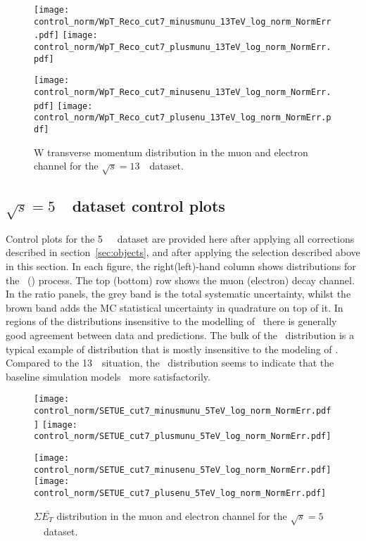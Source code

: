 \begin{figure}[h]
	\centering
	{\texttt{[image: control\_norm/WpT\_Reco\_cut7\_minusmunu\_13TeV\_log\_norm\_NormErr.pdf]}\label{f:}}
	{\texttt{[image: control\_norm/WpT\_Reco\_cut7\_plusmunu\_13TeV\_log\_norm\_NormErr.pdf]}\label{f:}}
	
	{\texttt{[image: control\_norm/WpT\_Reco\_cut7\_minusenu\_13TeV\_log\_norm\_NormErr.pdf]}\label{f:}}
	{\texttt{[image: control\_norm/WpT\_Reco\_cut7\_plusenu\_13TeV\_log\_norm\_NormErr.pdf]}\label{f:}}
	\caption{  W transverse momentum distribution in the muon and electron channel  for the $\sqrt{s} = 13$~\TeV\ dataset. }\end{figure}


\clearpage


\subsection{$\sqrt{s} = 5$~\TeV\ dataset control plots}
\label{subsec:controlplots5}
Control plots for the 5~\TeV\ \lowmu\ dataset are provided here after applying all corrections described in section~\ref{sec:objects}, and after applying the selection described above in this section. In each figure, the right(left)-hand column shows distributions for the \Wplus\ (\Wminus) process. The top (bottom) row shows the muon (electron) decay channel. In the ratio panels, the grey band is the total systematic uncertainty, whilst the brown band adds the MC statistical uncertainty in quadrature on top of it. In regions of the distributions insensitive to the modelling of \ptw\ there is generally good agreement between data and predictions. The bulk of the \mt\ distribution is a typical example of distribution that is mostly insensitive to the modeling of \ptw. Compared to the 13~\TeV\ situation, the \ut\ distribution seems to indicate that the baseline simulation models \ptw\ more satisfactorily.

\begin{figure}[h]
	\centering
	{\texttt{[image: control\_norm/SETUE\_cut7\_minusmunu\_5TeV\_log\_norm\_NormErr.pdf]}\label{f:SETUEmm5}}
	{\texttt{[image: control\_norm/SETUE\_cut7\_plusmunu\_5TeV\_log\_norm\_NormErr.pdf]}\label{f:SETUEpm5}}
	
	{\texttt{[image: control\_norm/SETUE\_cut7\_minusenu\_5TeV\_log\_norm\_NormErr.pdf]}\label{f:}}
	{\texttt{[image: control\_norm/SETUE\_cut7\_plusenu\_5TeV\_log\_norm\_NormErr.pdf]}\label{f:}}
	\caption{$\Sigma \bar{E_T}$ distribution in the muon and electron channel  for the $\sqrt{s} = 5$~\TeV\ dataset.}
\end{figure}
%


